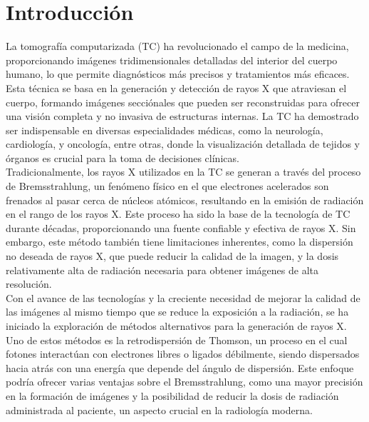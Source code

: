\vspace*{\fill}


\section{Introducción}



La tomografía computarizada (TC) ha revolucionado el campo de la medicina, proporcionando imágenes tridimensionales detalladas del interior del cuerpo humano, lo que permite diagnósticos más precisos y tratamientos más eficaces. Esta técnica se basa en la generación y detección de rayos X que atraviesan el cuerpo, formando imágenes secciónales que pueden ser reconstruidas para ofrecer una visión completa y no invasiva de estructuras internas. La TC ha demostrado ser indispensable en diversas especialidades médicas, como la neurología, cardiología, y oncología, entre otras, donde la visualización detallada de tejidos y órganos es crucial para la toma de decisiones clínicas. \\

Tradicionalmente, los rayos X utilizados en la TC se generan a través del proceso de Bremsstrahlung, un fenómeno físico en el que electrones acelerados son frenados al pasar cerca de núcleos atómicos, resultando en la emisión de radiación en el rango de los rayos X. Este proceso ha sido la base de la tecnología de TC durante décadas, proporcionando una fuente confiable y efectiva de rayos X. Sin embargo, este método también tiene limitaciones inherentes, como la dispersión no deseada de rayos X, que puede reducir la calidad de la imagen, y la dosis relativamente alta de radiación necesaria para obtener imágenes de alta resolución. \\

Con el avance de las tecnologías y la creciente necesidad de mejorar la calidad de las imágenes al mismo tiempo que se reduce la exposición a la radiación, se ha iniciado la exploración de métodos alternativos para la generación de rayos X. Uno de estos métodos es la retrodispersión de Thomson, un proceso en el cual fotones interactúan con electrones libres o ligados débilmente, siendo dispersados hacia atrás con una energía que depende del ángulo de dispersión. Este enfoque podría ofrecer varias ventajas sobre el Bremsstrahlung, como una mayor precisión en la formación de imágenes y la posibilidad de reducir la dosis de radiación administrada al paciente, un aspecto crucial en la radiología moderna. \\

